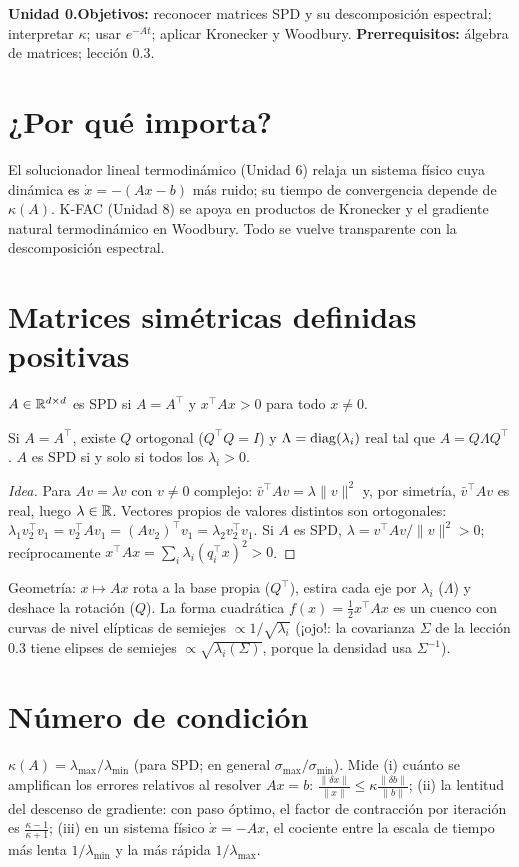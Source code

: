 \documentclass[11pt,a4paper]{article}
\begin{document}

\noindent\textbf{Unidad 0.}\quad\textbf{Objetivos:} reconocer matrices SPD y su descomposición espectral;
interpretar $\kappa$; usar $e^{-At}$; aplicar Kronecker y Woodbury. \textbf{Prerrequisitos:} álgebra de
matrices; lección 0.3.

\section{¿Por qué importa?}
El solucionador lineal termodinámico (Unidad 6) relaja un sistema físico cuya dinámica es $\dot x=-(Ax-b)$ más
ruido; su tiempo de convergencia depende de $\kappa(A)$. K-FAC (Unidad 8) se apoya en productos de Kronecker y
el gradiente natural termodinámico en Woodbury. Todo se vuelve transparente con la descomposición espectral.

\section{Matrices simétricas definidas positivas}
\begin{definicion}[ (SPD)]
$A\in\mathbb{R}^{d\times d}$ es SPD si $A=A^\top$ y $x^\top Ax>0$ para todo $x\neq0$.
\end{definicion}
\begin{teorema}[espectral]
Si $A=A^\top$, existe $Q$ ortogonal ($Q^\top Q=I$) y $\Lambda=\operatorname{diag}(\lambda_i)$ real tal que $A=Q\Lambda Q^\top$.
$A$ es SPD si y solo si todos los $\lambda_i>0$.
\end{teorema}
\begin{proof}[Idea]
Para $Av=\lambda v$ con $v\neq0$ complejo: $\bar v^\top Av=\lambda\|v\|^2$ y, por simetría, $\bar v^\top Av$ es real,
luego $\lambda\in\mathbb{R}$. Vectores propios de valores distintos son ortogonales: $\lambda_1v_2^\top v_1=v_2^\top Av_1=
(Av_2)^\top v_1=\lambda_2v_2^\top v_1$. Si $A$ es SPD, $\lambda=v^\top Av/\|v\|^2>0$; recíprocamente
$x^\top Ax=\sum_i\lambda_i(q_i^\top x)^2>0$.
\end{proof}
Geometría: $x\mapsto Ax$ rota a la base propia ($Q^\top$), estira cada eje por $\lambda_i$ ($\Lambda$) y deshace la
rotación ($Q$). La forma cuadrática $f(x)=\frac12x^\top Ax$ es un cuenco con curvas de nivel elípticas de
semiejes $\propto1/\sqrt{\lambda_i}$ (¡ojo!: la covarianza $\Sigma$ de la lección 0.3 tiene elipses de semiejes
$\propto\sqrt{\lambda_i(\Sigma)}$, porque la densidad usa $\Sigma^{-1}$).

\section{Número de condición}
$\kappa(A)=\lambda_{\max}/\lambda_{\min}$ (para SPD; en general $\sigma_{\max}/\sigma_{\min}$). Mide (i) cuánto se
amplifican los errores relativos al resolver $Ax=b$: $\frac{\|\delta x\|}{\|x\|}\le\kappa\frac{\|\delta b\|}{\|b\|}$;
(ii) la lentitud del descenso de gradiente: con paso óptimo, el factor de contracción por iteración es
$\frac{\kappa-1}{\kappa+1}$; (iii) en un sistema físico $\dot x=-Ax$, el cociente entre la escala de tiempo más
lenta $1/\lambda_{\min}$ y la más rápida $1/\lambda_{\max}$.
\end{document}
